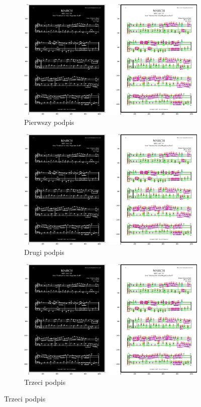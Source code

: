 \documentclass[12pt]{article}
\begin{document}
\begin{figure}[h!]
	\centering
	\begin{subfigure}[b]{0.32\linewidth}
		\includegraphics[width=\linewidth]{Zdj0.png}
		\caption{Pierwszy podpis}
	\end{subfigure}
	\begin{subfigure}[b]{0.32\linewidth}
		\includegraphics[width=\linewidth]{Zdj0.png}
		\caption{Drugi podpis}
	\end{subfigure}
	\begin{subfigure}[b]{0.32\linewidth}
		\includegraphics[width=\linewidth]{Zdj0.png}
		\caption{Trzeci podpis}
	\end{subfigure}
	

\end{figure}
\end{document}
